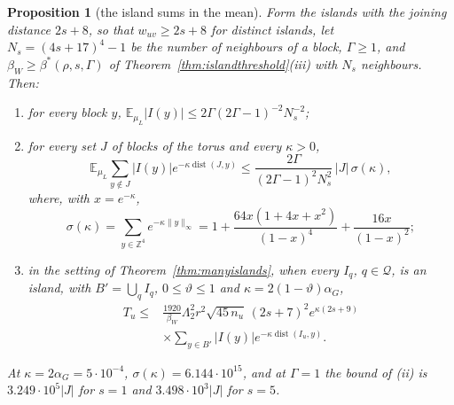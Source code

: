 \documentclass[11pt]{amsart}
\newtheorem{proposition}[theorem]{Proposition}
\theoremstyle{definition}
\theoremstyle{remark}
\numberwithin{equation}{section}
\newcommand{\Z}{\mathbb{Z}}
\newcommand{\E}{\mathbb{E}}
\newcommand{\dist}{\operatorname{dist}}
\begin{document}
\begin{proposition}[the island sums in the mean]\label{prop:islandmass}
Form the islands with the joining distance $2s+8$, so that $w_{uv}\ge2s+8$
for distinct islands, let $N_s=(4s+17)^4-1$ be the number of neighbours of
a block, $\varGamma\ge1$, and $\beta_W\ge\beta^*(\rho,s,\varGamma)$ of
Theorem~\ref{thm:islandthreshold}(iii) with $N_s$ neighbours. Then:
\begin{enumerate}[label=\textup{(\roman*)},leftmargin=*]
\item for every block $y$, $\E_{\mu_L}\lvert I(y)\rvert\le2\varGamma(2
\varGamma-1)^{-2}N_s^{-2}$;
\item for every set $J$ of blocks of the torus and every $\kappa>0$,
\[
\E_{\mu_L}\sum_{y\notin J}\lvert I(y)\rvert e^{-\kappa\dist(J,y)}\le
\frac{2\varGamma}{(2\varGamma-1)^2N_s^2}\,\lvert J\rvert\,\sigma(\kappa),
\]
where, with $x=e^{-\kappa}$,
\[
\sigma(\kappa)=\sum_{y\in\Z^4}e^{-\kappa\lVert y\rVert_\infty}=1+\frac{64x
(1+4x+x^2)}{(1-x)^4}+\frac{16x}{(1-x)^2};
\]
\item in the setting of Theorem~\ref{thm:manyislands}, when every $I_q$,
$q\in\mathcal Q$, is an island, with $B'=\bigcup_qI_q$,
$0\le\vartheta\le1$ and $\kappa=2(1-\vartheta)\alpha_G$,
\[
\begin{split}
T_u\le{}&\frac{1920}{\beta_W}\Lambda_2^2r^2\sqrt{45\,n_u}\,(2s+7)^2
e^{\kappa(2s+9)}\\
&\times\sum_{y\in B'}\lvert I(y)\rvert e^{-\kappa\dist(I_u,y)} .
\end{split}
\]
\end{enumerate}
At $\kappa=2\alpha_G=5\cdot10^{-4}$, $\sigma(\kappa)=6.144\cdot10^{15}$,
and at $\varGamma=1$ the bound of (ii) is $3.249\cdot10^5\lvert J\rvert$
for $s=1$ and $3.498\cdot10^3\lvert J\rvert$ for $s=5$.
\end{proposition}
\end{document}
